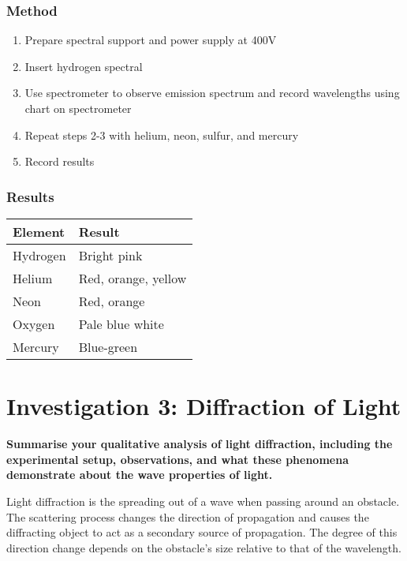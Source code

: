 \documentclass{report}
\begin{document}
		\subsubsection{Method}
			\begin{enumerate}
				\item Prepare spectral support and power supply at 400V
				\item Insert hydrogen spectral
				\item Use spectrometer to observe emission spectrum and record wavelengths using chart on spectrometer
				\item Repeat steps 2-3 with helium, neon, sulfur, and mercury
				\item Record results
			\end{enumerate}

		\subsubsection{Results}
			\begin{table}[H]
				\centering
				\begin{tabular}{p{3cm}|p{10cm}}
					\textbf{Element}	& \textbf{Result}			\\ \hline
					Hydrogen		& Bright pink				\\
					Helium			& Red, orange, yellow			\\
					Neon			& Red, orange				\\
					Oxygen			& Pale blue white			\\
					Mercury			& Blue-green				\\
				\end{tabular}
			\end{table}

\newpage

	\section{Investigation 3: Diffraction of Light}
	
		\textbf{Summarise your qualitative analysis of light diffraction, including the experimental setup, observations, and what these phenomena demonstrate about the wave properties of light.}

			\subitem Light diffraction is the spreading out of a wave when passing around an obstacle. The scattering process changes the direction of propagation and causes the diffracting object to act as a secondary source of propagation. The degree of this direction change depends on the obstacle's size relative to that of the wavelength.
\end{document}
